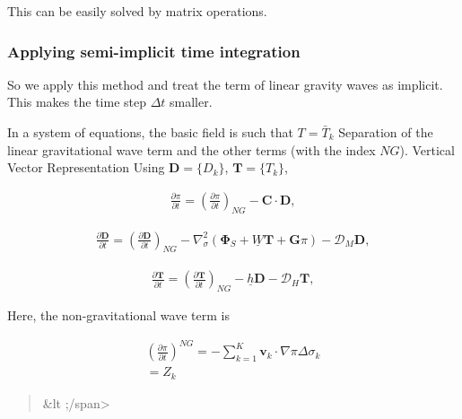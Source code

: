 This can be easily solved by matrix operations.

\hypertarget{applying-semi-implicit-time-integration}{%
\subsubsection{Applying semi-implicit time
integration}\label{applying-semi-implicit-time-integration}}

So we apply this method and treat the term of linear gravity waves as
implicit. This makes the time step \(\Delta t\) smaller.

In a system of equations, the basic field is such that \(T=\bar{T}_k\)
Separation of the linear gravitational wave term and the other terms
(with the index \(NG\)). Vertical Vector Representation Using
\(\mathbf{D}=\{ D_{k} \}\), \(\mathbf{T}=\{ T_{k} \}\),

\begin{eqnarray}
   \frac{\partial \pi}{\partial t} =
          \left( \frac{\partial \pi}{\partial t} \right)_{NG}  
     - \mathbf{C} \cdot \mathbf{D}  ,
\end{eqnarray}

\begin{eqnarray}
  \frac{\partial \mathbf{D}}{\partial t} =
          \left( \frac{\partial \mathbf{D}}{\partial t} \right)_{NG}  
          - \nabla^{2}_{\sigma} ( \mathbf{\Phi}_{S}
                                  + \underline{W} \mathbf{T}
                                  + \mathbf{G} \pi )  
          - {\mathcal D}_M \mathbf{D} ,
\end{eqnarray}

\begin{eqnarray}
  \frac{\partial \mathbf{T}}{\partial t}
      =   \left( \frac{\partial \mathbf{T}}
                        {\partial t}       \right)_{NG}  
         - \underline{h} \mathbf{D}
         - {\mathcal D}_H \mathbf{T} ,
\end{eqnarray}

Here, the non-gravitational wave term is

\begin{eqnarray}
  \left( \frac{\partial \pi}{\partial t} \right)^{NG}
   =   - \sum_{k=1}^{K} \mathbf{v}_{k} \cdot \nabla \pi  
       \Delta  \sigma_{k}  \\
   =   Z_{k}
\end{eqnarray}

\begin{quote}
\bout[Section Z]\&lt ;/span\textgreater{}
\end{quote}

